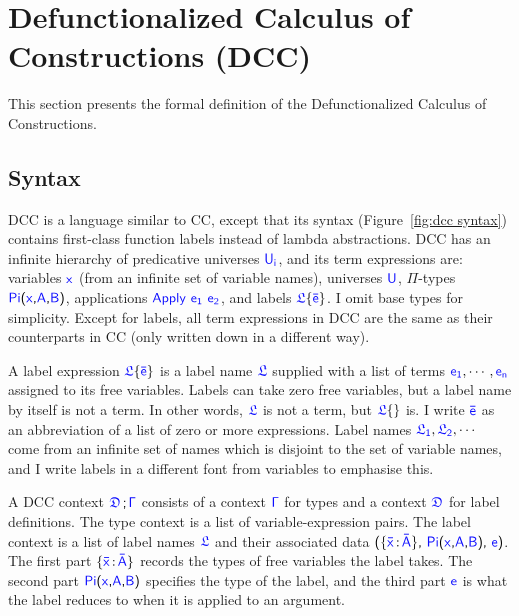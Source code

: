 
\section{Defunctionalized Calculus of Constructions (DCC)}
\label{sec:4.2}

This section presents the formal definition of the Defunctionalized Calculus of Constructions.

\subsection{Syntax}
DCC is a language similar to CC, except that its syntax (Figure~\ref{fig:dcc syntax}) contains first-class function labels instead of lambda abstractions.
DCC has an infinite hierarchy of predicative universes $\target{U_i}$, and its term expressions are: variables $\target{x}$ (from an infinite set of variable names), universes $\target{U}$, $\Pi$-types $\targetpi{x}{A}{B}$, applications $\targetapp{e_1}{e_2}$, and labels $\targetlab{\flabel}{\bar{e}}$. I omit base types for simplicity. Except for labels, all term expressions in DCC are the same as their counterparts in CC (only written down in a different way).

A label expression $\targetlab{\flabel}{\bar{e}}$ is a label name $\target{\flabel}$ supplied with a list of terms $\target{e_1}, \cdots, \target{e_n}$ assigned to its free variables. Labels can take zero free variables, but a label name by itself is not a term. In other words, $\target{\flabel}$ is not a term, but $\targetlab{\flabel}{}$ is. I write $\target{\bar{e}}$ as an abbreviation of a list of zero or more expressions. Label names $\target{\flabel_1}, \target{\flabel_2}, \cdots$ come from an infinite set of names which is disjoint to the set of variable names, and I write labels in a different font from variables to emphasise this.

A DCC context $\targetcon$ consists of a context $\target{\Gamma}$ for types and a context $\target{\fdef}$ for label definitions. The type context is a list of variable-expression pairs. The label context is a list of label names $\target{\flabel}$ and their associated data 
$\textsf{(}\{\itemtype{\bar{x}}{\bar{A}}\}\textsf{,}\ \targetpi{x}{A}{B} \textsf{,}\ \target{e} \textsf{)}$. 
The first part $\{\itemtype{\bar{x}}{\bar{A}}\}$ records the types of free variables the label takes. 
The second part $\targetpi{x}{A}{B}$ specifies the type of the label, and the third part $\target{e}$ is what the label reduces to when it is applied to an argument.


